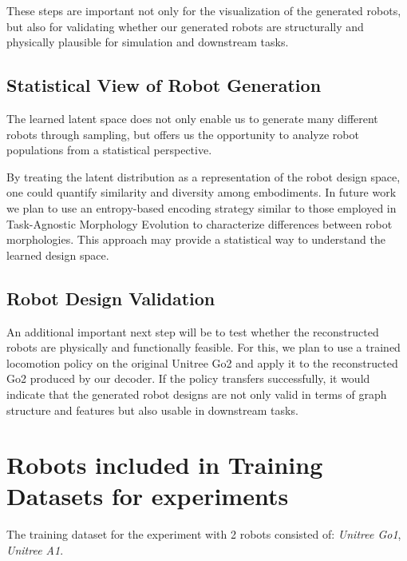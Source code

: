 \documentclass{article}
\theoremstyle{plain}
\theoremstyle{definition}
\theoremstyle{remark}
\begin{document}
These steps are important not only for the visualization of the generated robots, but also for validating whether our generated robots are structurally and physically plausible for simulation and downstream tasks.

\subsection{Statistical View of Robot Generation}
The learned latent space does not only enable us to generate many different robots through sampling, but offers us the opportunity to analyze robot populations from a statistical perspective. 

By treating the latent distribution as a representation of the robot design space, one could quantify similarity and diversity among embodiments. In future work we plan to use an entropy-based encoding strategy similar to those employed in Task-Agnostic Morphology Evolution \cite{hejna2021task} to characterize differences between robot morphologies. This approach may provide a statistical way to understand the learned design space.

\subsection{Robot Design Validation}
An additional important next step will be to test whether the reconstructed robots are physically and functionally feasible. For this, we plan to use a trained locomotion policy on the original Unitree Go2 and apply it to the reconstructed Go2 produced by our decoder. If the policy transfers successfully, it would indicate that the generated robot designs are not only valid in terms of graph structure and features but also usable in downstream tasks.

\nocite{langley00}





\newpage
\appendix
\onecolumn

\section{Robots included in Training Datasets for experiments} \label{robots_training_data}
The training dataset for the experiment with 2 robots consisted of: \textit{Unitree Go1}, \textit{Unitree A1}.
\end{document}
